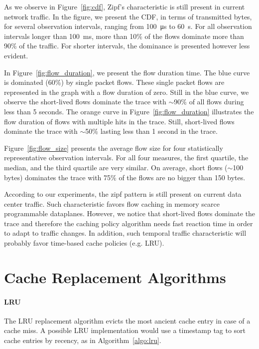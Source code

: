 As we observe in Figure~\ref{fig:cdf}, Zipf's characteristic is still present in current network traffic.
In the figure, we present the CDF, in terms of transmitted bytes, for several observation intervals, ranging from \SI{100}{\micro\second} to \SI{60}{\second}.
For all observation intervals longer than \SI{100}{\milli\second}, more than 10\% of the flows dominate more than 90\% of the traffic.
For shorter intervals, the dominance is presented however less evident.

In Figure~\ref{fig:flow_duration}, we present the flow duration time.
The blue curve is dominated (60\%) by single packet flows.
These single packet flows are represented in the graph with a flow duration of zero.
Still in the blue curve, we observe the short-lived flows dominate the trace with $\sim$90\% of all flows during less than 5 seconds.
The orange curve in Figure~\ref{fig:flow_duration} illustrates the flow duration of flows with multiple hits in the trace.
Still, short-lived flows dominate the trace with $\sim$50\% lasting less than 1 second in the trace.

Figure~\ref{fig:flow_size} presents the average flow size for four statistically representative observation intervals.
For all four measures, the first quartile, the median, and the third quartile are very similar.
On average, short flows ($\sim$100 bytes) dominates the trace with 75\% of the flows are no bigger than 150 bytes.

According to our experiments, the zipf pattern is still present on current data center traffic.
Such characteristic favors flow caching in memory scarce programmable dataplanes.
However, we notice that short-lived flows dominate the trace and therefore the caching policy algorithm needs fast reaction time in order to adapt to traffic changes.
In addition, such temporal traffic characteristic will probably favor time-based cache policies (e.g. LRU).

\section{Cache Replacement Algorithms}

\paragraph{LRU}
The LRU replacement algorithm evicts the most ancient cache entry in case of a cache miss.
A possible LRU implementation would use a timestamp tag to sort cache entries by recency, as in Algorithm~\ref{algo:lru}.

